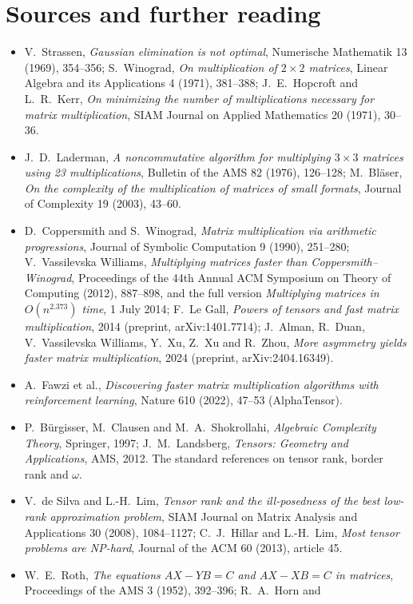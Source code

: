 \section*{Sources and further reading}

\begin{itemize}
\item V.~Strassen, \emph{Gaussian elimination is not optimal}, Numerische Mathematik 13 (1969), 354--356; S.~Winograd, \emph{On
multiplication of $2\times2$ matrices}, Linear Algebra and its Applications 4 (1971), 381--388; J.~E.~Hopcroft and L.~R.~Kerr, \emph{On
minimizing the number of multiplications necessary for matrix multiplication}, SIAM Journal on Applied Mathematics 20 (1971), 30--36.
\item J.~D.~Laderman, \emph{A noncommutative algorithm for multiplying $3\times3$ matrices using 23 multiplications}, Bulletin of the
AMS 82 (1976), 126--128; M.~Bl\"aser, \emph{On the complexity of the multiplication of matrices of small formats}, Journal of
Complexity 19 (2003), 43--60.
\item D.~Coppersmith and S.~Winograd, \emph{Matrix multiplication via arithmetic progressions}, Journal of Symbolic Computation 9
(1990), 251--280; V.~Vassilevska Williams, \emph{Multiplying matrices faster than Coppersmith--Winograd}, Proceedings of the 44th Annual ACM Symposium on Theory of Computing (2012), 887--898, and the full version \emph{Multiplying matrices in $O(n^{2.373})$ time}, 1 July 2014; F.~Le Gall, \emph{Powers of tensors and fast matrix multiplication}, 2014 (preprint, arXiv:1401.7714); J.~Alman, R.~Duan, V.~Vassilevska Williams, Y.~Xu, Z.~Xu and R.~Zhou, \emph{More asymmetry yields faster matrix
multiplication}, 2024 (preprint, arXiv:2404.16349).
\item A.~Fawzi et al., \emph{Discovering faster matrix multiplication algorithms with reinforcement learning}, Nature 610 (2022),
47--53 (AlphaTensor).
\item P.~B\"urgisser, M.~Clausen and M.~A.~Shokrollahi, \emph{Algebraic Complexity Theory}, Springer, 1997; J.~M.~Landsberg,
\emph{Tensors: Geometry and Applications}, AMS, 2012. The standard references on tensor rank, border rank and $\omega$.
\item V.~de Silva and L.-H.~Lim, \emph{Tensor rank and the ill-posedness of the best low-rank approximation problem}, SIAM Journal
on Matrix Analysis and Applications 30 (2008), 1084--1127; C.~J.~Hillar and L.-H.~Lim, \emph{Most tensor problems are NP-hard},
Journal of the ACM 60 (2013), article 45.
\item W.~E.~Roth, \emph{The equations $AX-YB=C$ and $AX-XB=C$ in matrices}, Proceedings of the AMS 3 (1952), 392--396; R.~A.~Horn and

\end{itemize}
